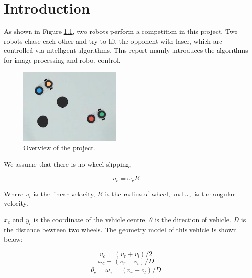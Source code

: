 \chapter{Introduction}
\renewcommand{\thepage}{\arabic{page}}
\setcounter{page}{1}

As shown in Figure \ref{intro}, two robots perform a competition in this project. Two robots chase each other and try to hit the opponent with laser, which are controlled via intelligent algorithms. This report mainly introduces the algorithms for image processing and robot control.

\begin{figure}[thb]
    \centering
    \includegraphics[width=0.45\textwidth]{images/intro.png}
    \caption[Overview of the project]{Overview of the project.}
    \label{intro}
\end{figure}


We assume that there is no wheel slipping, 


$$ v_r = \omega_r R $$

Where $v_r$ is the linear velocity, $R$ is the radius of wheel, and $\omega_r$ is the angular velocity.

$x_c$ and $y_c$ is the coordinate of the vehicle centre. $\theta$ is the direction of vehicle. $D$ is the distance bewteen two wheels. The geometry model of this vehicle is shown below:

$$ v_c = (v_r+v_l)/2 $$
$$ \omega_c = ( v_r - v_l ) / D $$
$$ \dot{\theta_c} = \omega_c = ( v_r - v_l ) / D $$



